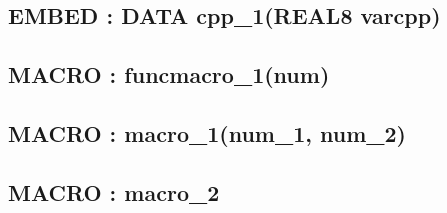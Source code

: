 \subsection*{EMBED : DATA cpp\_1(REAL8 varcpp)}
\hypertarget{ecldoc:example_example.cpp_1}{}
\subsection*{MACRO : funcmacro\_1(num)}
\hypertarget{ecldoc:example_example.funcmacro_1}{}
\subsection*{MACRO : macro\_1(num\_1, num\_2)}
\hypertarget{ecldoc:example_example.macro_1}{}
\subsection*{MACRO : macro\_2}
\hypertarget{ecldoc:example_example.macro_2}{}

